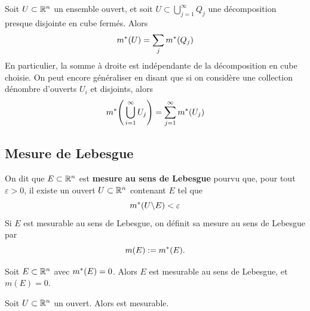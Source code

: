 \begin{corollaire}
	Soit $U \subset \mathbb{R}^n$ un ensemble ouvert, et soit $U \subset \bigcup_{j=1}^\infty Q_j$ une décomposition presque disjointe en cube fermés. Alors
	\[
	m^* ( U ) = \sum_j m^* ( Q_j )
	\]
	En particulier, la somme à droite est indépendante de la décomposition en cube choisie. On peut encore généraliser en disant que si on considère une collection dénombre d'ouverts $U_i$ et disjoints, alors
	\[
	m^* \Bigg(\bigcup_{i=1}^\infty U_j\Bigg) = \sum_{j=1}^\infty m^* ( U_j )
	\]
\end{corollaire}


\subsection{Mesure de Lebesgue}
\begin{definition} \label{def: Mesure de Lebesgue}
	On dit que $E \subset \mathbb{R}^n$ est \textbf{mesure au sens de Lebesgue} pourvu que, pour tout $\varepsilon > 0$, il existe un ouvert $U \subset \mathbb{R}^n$ contenant $E$ tel que
	\[
	m^* ( U \backslash E ) < \varepsilon
	\]
	Si $E$ est mesurable au sens de Lebesgue, on définit sa mesure au sens de Lebesgue par
	\[
	m(E) := m^* ( E ).
	\]
\end{definition}

\begin{proposition} \label{prop: Mesurabilité d'un ensemble de mesure nulle}
	Soit $E \subset \mathbb{R}^n$ avec $m^* ( E ) = 0$. Alors $E$ est mesurable au sens de Lebesgue, et $m(E) = 0$.
\end{proposition}


\begin{proposition}
	Soit $U \subset \mathbb{R}^n$ un ouvert. Alors est mesurable.
\end{proposition}



